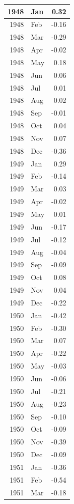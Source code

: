 \documentclass[
]{article}
\begin{document}
\begin{table}[H]
\begin{tabular}[t]{r|l|r}
\hline
1948 & Jan & 0.32\\
\hline
1948 & Feb & -0.16\\
\hline
1948 & Mar & -0.29\\
\hline
1948 & Apr & -0.02\\
\hline
1948 & May & 0.18\\
\hline
1948 & Jun & 0.06\\
\hline
1948 & Jul & 0.01\\
\hline
1948 & Aug & 0.02\\
\hline
1948 & Sep & -0.01\\
\hline
1948 & Oct & 0.04\\
\hline
1948 & Nov & 0.07\\
\hline
1948 & Dec & -0.36\\
\hline
1949 & Jan & 0.29\\
\hline
1949 & Feb & -0.14\\
\hline
1949 & Mar & 0.03\\
\hline
1949 & Apr & -0.02\\
\hline
1949 & May & 0.01\\
\hline
1949 & Jun & -0.17\\
\hline
1949 & Jul & -0.12\\
\hline
1949 & Aug & -0.04\\
\hline
1949 & Sep & -0.09\\
\hline
1949 & Oct & 0.08\\
\hline
1949 & Nov & 0.04\\
\hline
1949 & Dec & -0.22\\
\hline
1950 & Jan & -0.42\\
\hline
1950 & Feb & -0.30\\
\hline
1950 & Mar & 0.07\\
\hline
1950 & Apr & -0.22\\
\hline
1950 & May & -0.03\\
\hline
1950 & Jun & -0.06\\
\hline
1950 & Jul & -0.21\\
\hline
1950 & Aug & -0.23\\
\hline
1950 & Sep & -0.10\\
\hline
1950 & Oct & -0.09\\
\hline
1950 & Nov & -0.39\\
\hline
1950 & Dec & -0.09\\
\hline
1951 & Jan & -0.36\\
\hline
1951 & Feb & -0.54\\
\hline
1951 & Mar & -0.18\\

\end{tabular}
\end{table}
\end{document}
